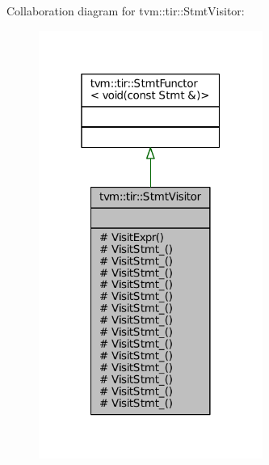 Collaboration diagram for tvm\+:\+:tir\+:\+:Stmt\+Visitor\+:
\nopagebreak
\begin{figure}[H]
\begin{center}
\leavevmode
\includegraphics[width=208pt]{classtvm_1_1tir_1_1StmtVisitor__coll__graph}
\end{center}
\end{figure}
